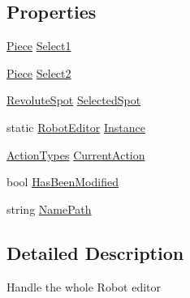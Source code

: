 \subsection*{Properties}
\begin{DoxyCompactItemize}
\item 
\hyperlink{classgearit_1_1src_1_1robot_1_1_piece}{Piece} \hyperlink{classgearit_1_1src_1_1editor_1_1robot_1_1_robot_editor_a113822ab2705b3105776f3e3a626b0fc}{Select1}
\item 
\hyperlink{classgearit_1_1src_1_1robot_1_1_piece}{Piece} \hyperlink{classgearit_1_1src_1_1editor_1_1robot_1_1_robot_editor_a94e76ef4cb4328f2e4436aec6fc6e8f8}{Select2}
\item 
\hyperlink{classgearit_1_1src_1_1robot_1_1_revolute_spot}{Revolute\+Spot} \hyperlink{classgearit_1_1src_1_1editor_1_1robot_1_1_robot_editor_a424bf0546fa967030fce1fae34891671}{Selected\+Spot}
\item 
static \hyperlink{classgearit_1_1src_1_1editor_1_1robot_1_1_robot_editor}{Robot\+Editor} \hyperlink{classgearit_1_1src_1_1editor_1_1robot_1_1_robot_editor_a027df8029e13d8f7bcdca7e9380d942f}{Instance}
\item 
\hyperlink{namespacegearit_1_1src_1_1editor_1_1robot_1_1action_a4be0fd46e3952d6135136b20e7b3fc5e}{Action\+Types} \hyperlink{classgearit_1_1src_1_1editor_1_1robot_1_1_robot_editor_aab2bcb40e44e304597e407b4fd119f2a}{Current\+Action}
\item 
bool \hyperlink{classgearit_1_1src_1_1editor_1_1robot_1_1_robot_editor_a3005ed61f49a163b7375a84fe982c08f}{Has\+Been\+Modified}
\item 
string \hyperlink{classgearit_1_1src_1_1editor_1_1robot_1_1_robot_editor_a688534a36ca167093da4469b1c072af6}{Name\+Path}
\end{DoxyCompactItemize}


\subsection{Detailed Description}
Handle the whole Robot editor 



